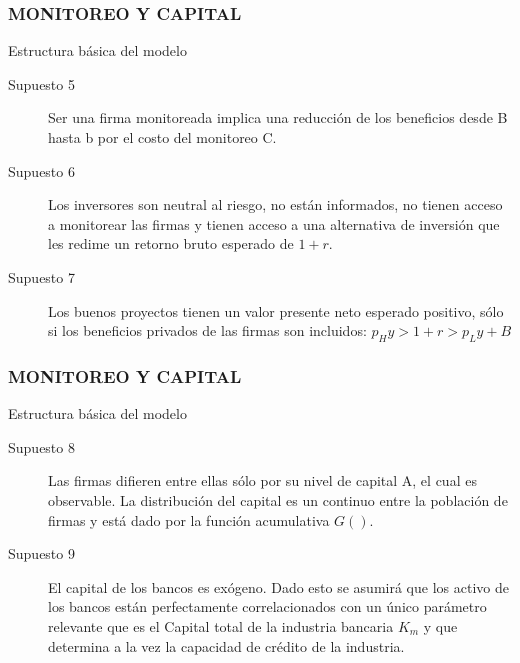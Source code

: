 \begin{frame}
    \frametitle{{\normalsize MONITOREO Y CAPITAL} {}}
    
    \begin{block} {Estructura básica del modelo}
        \begin{description}
             \item[Supuesto 5] Ser una firma monitoreada implica una reducción de los beneficios desde B hasta b por el costo del monitoreo C.
            \item[Supuesto 6] Los inversores son neutral al riesgo, no están informados, no tienen acceso a monitorear las firmas y tienen acceso a una alternativa de inversión que les redime un retorno bruto esperado de $1+r$.
           \item[Supuesto 7] Los buenos proyectos tienen un valor presente neto esperado positivo, sólo si los beneficios privados de las firmas son incluidos: $p_{H}y>1+r>p_{L}y+B $
           
        \end{description}
          
    \end{block}	

   \end{frame}

\begin{frame}
\frametitle{{\normalsize MONITOREO Y CAPITAL} {}}

\begin{block} {Estructura básica del modelo}
	\begin{description}
		\item[Supuesto 8] Las firmas difieren entre ellas sólo por su nivel de capital A, el cual es observable. La distribución del capital es un continuo entre la población de firmas y está dado por la función acumulativa $G()$.
		\item[Supuesto 9] El capital de los bancos es exógeno. Dado esto se asumirá que los activo de los bancos están perfectamente correlacionados con un único parámetro relevante que es el Capital total de la industria bancaria $K_{m}$ y que determina a la vez la capacidad de crédito de la industria.  
	\end{description}
	
\end{block}	

\end{frame}


